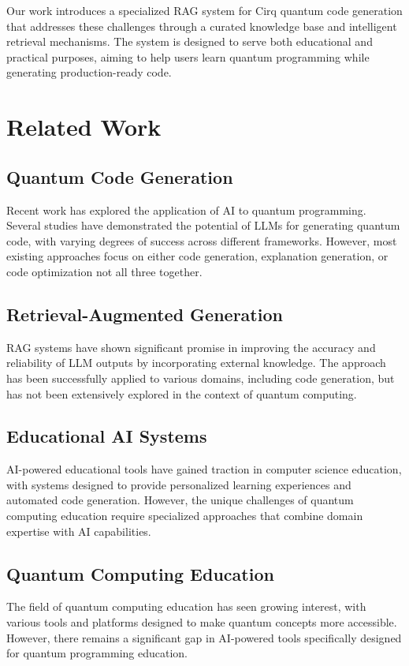 \documentclass[runningheads]{llncs}
\begin{document}
Our work introduces a specialized RAG system for Cirq quantum code generation that addresses these challenges through a curated knowledge base and intelligent retrieval mechanisms. The system is designed to serve both educational and practical purposes, aiming to help users learn quantum programming while generating production-ready code.

\section{Related Work}

\subsection{Quantum Code Generation}
Recent work has explored the application of AI to quantum programming. Several studies have demonstrated the potential of LLMs for generating quantum code, with varying degrees of success across different frameworks. However, most existing approaches focus on either code generation, explanation generation, or code optimization not all three together.

\subsection{Retrieval-Augmented Generation}
RAG systems have shown significant promise in improving the accuracy and reliability of LLM outputs by incorporating external knowledge. The approach has been successfully applied to various domains, including code generation, but has not been extensively explored in the context of quantum computing.

\subsection{Educational AI Systems}
AI-powered educational tools have gained traction in computer science education, with systems designed to provide personalized learning experiences and automated code generation. However, the unique challenges of quantum computing education require specialized approaches that combine domain expertise with AI capabilities.

\subsection{Quantum Computing Education}
The field of quantum computing education has seen growing interest, with various tools and platforms designed to make quantum concepts more accessible. However, there remains a significant gap in AI-powered tools specifically designed for quantum programming education.
\end{document}
